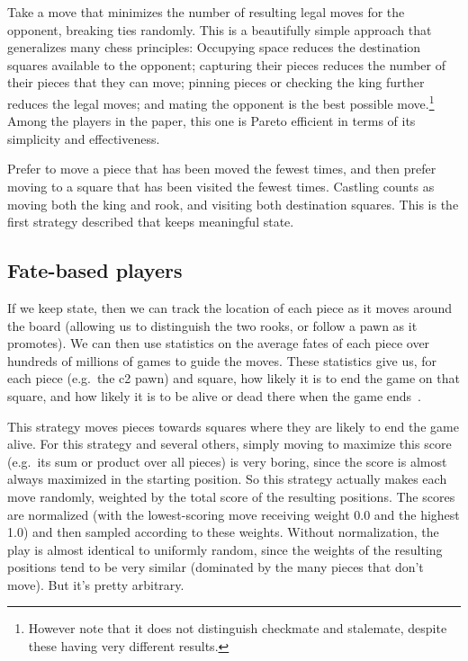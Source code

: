 \documentclass[10pt,preprint,twocolumn]{acmart}
\begin{document}
 Take a move that minimizes the
number of resulting legal moves for the opponent, breaking ties
randomly. This is a beautifully simple approach that generalizes many
chess principles: Occupying space reduces the destination squares
available to the opponent; capturing their pieces reduces the number
of their pieces that they can move; pinning pieces or checking the
king further reduces the legal moves; and mating the opponent is the
best possible move.\footnote{However note that it does not distinguish
  checkmate and stalemate, despite these having very different
  results.} Among the players in the paper, this one is Pareto
efficient in terms of its simplicity and effectiveness. \canonical

 Prefer to move a piece that has been
moved the fewest times, and then prefer moving to a square that
has been visited the fewest times. Castling counts as moving
both the king and rook, and visiting both destination squares.
This is the first strategy described that keeps meaningful state.
\canonical \stateful

\subsection{Fate-based players}

If we keep state, then we can track the location of each piece as it
moves around the board (allowing us to distinguish the two rooks, or
follow a pawn as it promotes). We can then use statistics on the
average fates of each piece over hundreds of millions of games to
guide the moves. These statistics give us, for each piece (e.g.~the c2
pawn) and square, how likely it is to end the game on that square, and
how likely it is to be alive or dead there when the game
ends~\cite{survival}.

 This strategy moves pieces towards squares where
they are likely to end the game alive. For this strategy and several
others, simply moving to maximize this score (e.g.~its sum or product
over all pieces) is very boring, since the score is almost always
maximized in the starting position. So this strategy actually makes
each move randomly, weighted by the total score of the resulting
positions. The scores are normalized (with the lowest-scoring move
receiving weight 0.0 and the highest 1.0) and then sampled according
to these weights. Without normalization, the play is almost identical
to uniformly random, since the weights of the resulting positions tend
to be very similar (dominated by the many pieces that don't move). But
it's pretty arbitrary. \stateful
\end{document}
